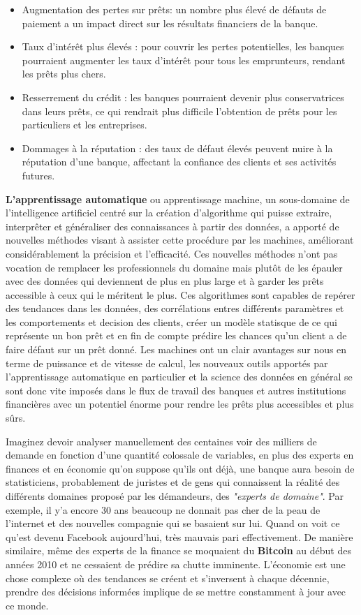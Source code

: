 \begin{itemize}
    \item Augmentation des pertes sur prêts: un nombre plus élevé de défauts de paiement a un impact direct sur les résultats financiers de la banque.
    \item Taux d’intérêt plus élevés : pour couvrir les pertes potentielles, les banques pourraient augmenter les taux d’intérêt pour tous les emprunteurs, rendant les prêts plus chers.
    \item Resserrement du crédit : les banques pourraient devenir plus conservatrices dans leurs prêts, ce qui rendrait plus difficile l’obtention de prêts pour les particuliers et les entreprises.
    \item Dommages à la réputation : des taux de défaut élevés peuvent nuire à la réputation d’une banque, affectant la confiance des clients et ses activités futures.
\end{itemize}

\textbf{L'apprentissage automatique} ou apprentissage machine, un sous-domaine de l'intelligence artificiel centré sur la création d'algorithme qui puisse extraire, interprêter et généraliser des connaissances à partir des données, a apporté de nouvelles méthodes visant à assister cette procédure par les machines, améliorant considérablement la précision et l’efficacité. Ces nouvelles méthodes n'ont pas vocation de remplacer les professionnels du domaine mais plutôt de les épauler avec des données qui deviennent de plus en plus large et à garder les prêts accessible à ceux qui le méritent le plus. Ces algorithmes sont capables de repérer des tendances dans les données, des corrélations entres différents paramètres et les comportements et decision des clients, créer un modèle statisque de ce qui représente un bon prêt et en fin de compte prédire les chances qu'un client a de faire défaut sur un prêt donné. Les machines ont un clair avantages sur nous en terme de puissance et de vitesse de calcul, les nouveaux outils apportés par l'apprentissage automatique en particulier et la science des données en général se sont donc vite imposés dans le flux de travail des banques et autres institutions financières avec un potentiel énorme pour rendre les prêts plus accessibles et plus sûrs.

Imaginez devoir analyser manuellement des centaines voir des milliers de demande en fonction d'une quantité colossale de variables, en plus des experts en finances et en économie qu'on suppose qu'ils ont déjà, une banque aura besoin de statisticiens, probablement de juristes et de gens qui connaissent la réalité des différents domaines proposé par les démandeurs, des \textit{"experts de domaine"}. Par exemple, il y'a encore 30 ans beaucoup ne donnait pas cher de la peau de l'internet et des nouvelles compagnie qui se basaient sur lui. Quand on voit ce qu'est devenu Facebook aujourd'hui, très mauvais pari effectivement. De manière similaire, même des experts de la finance se moquaient du \textbf{Bitcoin} au début des années 2010 et ne cessaient de prédire sa chutte imminente. L'économie est une chose complexe où des tendances se créent et s'inversent à chaque décennie, prendre des décisions informées implique de se mettre constamment à jour avec ce monde.

